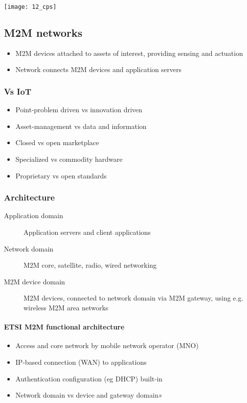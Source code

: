 \texttt{[image: 12\_cps]}

\subsection{M2M networks}

\begin{itemize}
		\item M2M devices attached to assets of interest, providing sensing and actuation
		\item Network connects M2M devices and application servers
\end{itemize}

\subsubsection{Vs IoT}

\begin{itemize}
		\item Point-problem driven vs innovation driven
		\item Asset-management vs data and information
		\item Closed vs open marketplace
		\item Specialized vs commodity hardware
		\item Proprietary vs open standards
\end{itemize}

\subsubsection{Architecture}

\begin{description}
		\item[Application domain] Application servers and client applications
		\item[Network domain] M2M core, satellite, radio, wired networking
		\item[M2M device domain] M2M devices, connected to network domain via
				M2M gateway, using e.g. wireless M2M area networks
\end{description}

\paragraph{ETSI M2M functional architecture}

\begin{itemize}
		\item Access and core network by mobile network operator (MNO)
		\item IP-based connection (WAN) to applications
		\item Authentication configuration (eg DHCP) built-in
		\item Network domain vs device and gateway domain»
\end{itemize}

